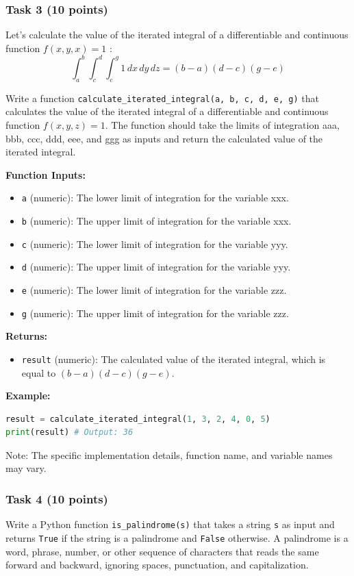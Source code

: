 \documentclass[12pt]{article}
\begin{document}
\subsubsection{Task 3 (10 points)}

Let's calculate the value of the iterated integral of a differentiable and continuous function $f(x,y,x) = 1$ :
\[
\int_a^b \int_c^d \int_e^g 1 \, dx \, dy \, dz = (b - a)(d - c)(g - e)
\]

Write a function \texttt{calculate\_iterated\_integral(a, b, c, d, e, g)} that calculates the value of the iterated integral of a differentiable and continuous function $f(x,y,z)=1$. The function should take the limits of integration aaa, bbb, ccc, ddd, eee, and ggg as inputs and return the calculated value of the iterated integral.

\textbf{Function Inputs:}
\begin{itemize}
\item \texttt{a} (numeric): The lower limit of integration for the variable xxx.
\item \texttt{b} (numeric): The upper limit of integration for the variable xxx.
\item \texttt{c} (numeric): The lower limit of integration for the variable yyy.
\item \texttt{d} (numeric): The upper limit of integration for the variable yyy.
\item \texttt{e} (numeric): The lower limit of integration for the variable zzz.
\item \texttt{g} (numeric): The upper limit of integration for the variable zzz.
\end{itemize}

\textbf{Returns:}
\begin{itemize}
\item \texttt{result} (numeric): The calculated value of the iterated integral, which is equal to $(b - a)(d - c)(g - e)$.
\end{itemize}

\textbf{Example:}
\begin{lstlisting}[language=Python]
result = calculate_iterated_integral(1, 3, 2, 4, 0, 5)
print(result) # Output: 36
\end{lstlisting}

Note: The specific implementation details, function name, and variable names may vary.


\subsubsection{Task 4 (10 points)}
Write a Python function \texttt{is\_palindrome(s)} that takes a string \texttt{s} as input and returns \texttt{True} if the string is a palindrome and \texttt{False} otherwise. A palindrome is a word, phrase, number, or other sequence of characters that reads the same forward and backward, ignoring spaces, punctuation, and capitalization.
\end{document}
